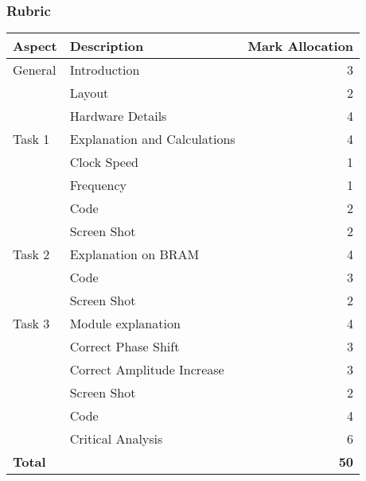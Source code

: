 \subsubsection{Rubric}
\begin{tabular}{|l|l|r|}
\hline
\textbf{Aspect} & \textbf{Description} & \multicolumn{1}{l|}{\textbf{Mark Allocation}} \\ \hline
General & Introduction & 3 \\ \hline
 & Layout & 2 \\ \hline
 & Hardware Details & 4 \\ \hline
Task 1 & Explanation and Calculations & 4 \\ \hline
 & Clock Speed & 1 \\ \hline
 & Frequency & 1 \\ \hline
 & Code & 2 \\ \hline
 & Screen Shot & 2 \\ \hline
Task 2 & Explanation on BRAM & 4 \\ \hline
& Code & 3 \\ \hline
& Screen Shot & 2 \\ \hline
Task 3 & Module explanation & 4 \\ \hline
& Correct Phase Shift & 3 \\ \hline
& Correct Amplitude Increase & 3 \\ \hline
& Screen Shot & 2 \\ \hline
& Code & 4 \\ \hline
& Critical Analysis & 6 \\ \hline
\textbf{Total} &  & \textbf{50} \\ \hline
\end{tabular}

